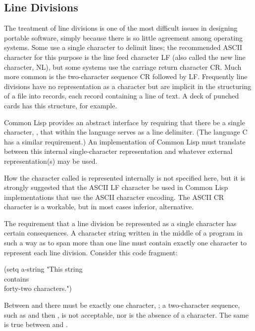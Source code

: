 \subsection{Line Divisions}

The treatment of line divisions is one of the most difficult issues
in designing portable software, simply because there is so little agreement
among operating systems.  Some use a single character to delimit lines;
the recommended ASCII character for this purpose is the line feed character
LF (also called the new line character, NL),
but some systems use the carriage
return character CR.  Much more common is the two-character sequence
CR followed by LF.  Frequently line divisions have no representation
as a character but are implicit in the structuring of a file into records,
each record containing a line of text.  A deck of punched cards has this
structure, for example.

Common Lisp provides an abstract interface by requiring that there be a single
character, , that within the language serves as a line
delimiter.  (The language C has a similar requirement.)
An implementation of Common Lisp must translate between this internal
single-character representation and whatever external representation(s)
may be used.

\beforenoterule
\begin{implementation}
How the character called  is represented
internally is not specified here, but it is strongly suggested that
the ASCII LF character be used in Common Lisp implementations that use the
ASCII character encoding.  The ASCII CR character is a workable,
but in most cases inferior, alternative.
\end{implementation}
\afternoterule

The requirement that a line division be represented as a single character
has certain consequences.  A character string
written in the middle of a program in such a way as to span more than
one line must contain exactly one character to represent each line division.
Consider this code fragment:
\begin{lisp}
(setq a-string "This string \\
contains \\
forty-two characters.")
\end{lisp}
Between  and  there must be exactly one character,
; a two-character sequence, such as  and then
, is not acceptable, nor is the absence of a character.
The same is true between  and .

